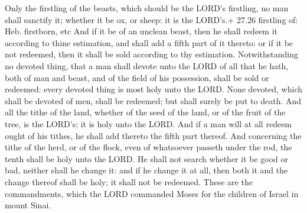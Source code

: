  Only the firstling of the beasts, which should be the
LORD's firstling, no man shall sanctify it; whether it be ox, or sheep:
it is the LORD's.+ 27.26 firstling of: Heb. firstborn, etc 
And if it be of an unclean beast, then he shall redeem it according to
thine estimation, and shall add a fifth part of it thereto: or if it be
not redeemed, then it shall be sold according to thy estimation.
 Notwithstanding no devoted thing, that a man shall devote
unto the LORD of all that he hath, both of man and beast, and of the
field of his possession, shall be sold or redeemed: every devoted thing
is most holy unto the LORD.  None devoted, which shall be
devoted of men, shall be redeemed; but shall surely be put to death.
 And all the tithe of the land, whether of the seed of the
land, or of the fruit of the tree, is the LORD's: it is holy unto the
LORD.  And if a man will at all redeem ought of his tithes,
he shall add thereto the fifth part thereof.  And
concerning the tithe of the herd, or of the flock, even of whatsoever
passeth under the rod, the tenth shall be holy unto the LORD.
 He shall not search whether it be good or bad, neither
shall he change it: and if he change it at all, then both it and the
change thereof shall be holy; it shall not be redeemed. 
These are the commandments, which the LORD commanded Moses for the
children of Israel in mount Sinai.
